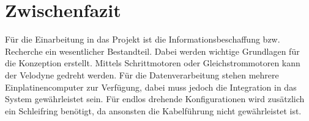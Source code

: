 \section{Zwischenfazit}
\label{ZwischenfazitInfo}
Für die Einarbeitung in das Projekt ist die Informationsbeschaffung bzw. Recherche ein wesentlicher Bestandteil. Dabei werden wichtige Grundlagen für die Konzeption erstellt. Mittels Schrittmotoren oder Gleichstrommotoren kann der Velodyne gedreht werden. Für die Datenverarbeitung stehen mehrere Einplatinencomputer zur Verfügung, dabei muss jedoch die Integration in das System gewährleistet sein. Für endlos drehende Konfigurationen wird zusätzlich ein Schleifring benötigt, da ansonsten die Kabelführung nicht gewährleistet ist. 